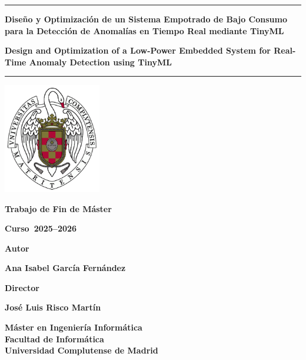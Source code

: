 \documentclass[11pt,a4paper]{book}
\newcommand{\miAutor}{Ana Isabel García Fernández}
\newcommand{\miDirector}{José Luis Risco Martín}
\newcommand{\miTituloES}{Diseño y Optimización de un Sistema Empotrado de Bajo Consumo para la Detección de Anomalías en Tiempo Real mediante TinyML}
\newcommand{\miTituloEN}{Design and Optimization of a Low-Power Embedded System for Real-Time Anomaly Detection using TinyML}
\newcommand{\miTFX}{Trabajo de Fin de Máster}
\newcommand{\miCurso}{2025--2026}
\newcommand{\misEstudios}{Máster en Ingeniería Informática}
\begin{document}
\frontmatter

\begin{titlepage}
\centering

\vspace*{1.75cm}

\rule{12cm}{1pt}

{\Large \textbf{\miTituloES} \par}
{\Large \textbf{\miTituloEN} \par} 

\rule{12cm}{1pt}

\vspace{0.75cm}
\includegraphics[width=4.25cm]{core/logo_ucm.png}
\vspace{0.75cm}

{\Large \textbf{\miTFX}} \\
{\Large \textbf{Curso~\miCurso} \par}

\vspace{1cm}
\vfill

{\Large \textbf{Autor}} \\
{\large \textbf{\miAutor} \par}

\vspace{0.25cm}

{\Large \textbf{Director}} \\
{\large \textbf{\miDirector} \par}

\vspace{0.25cm}

{\large \textbf{\misEstudios}}\\
{\large \textbf{Facultad de Informática}}\\
{\large \textbf{Universidad Complutense de Madrid}}

\end{titlepage}
\end{document}

